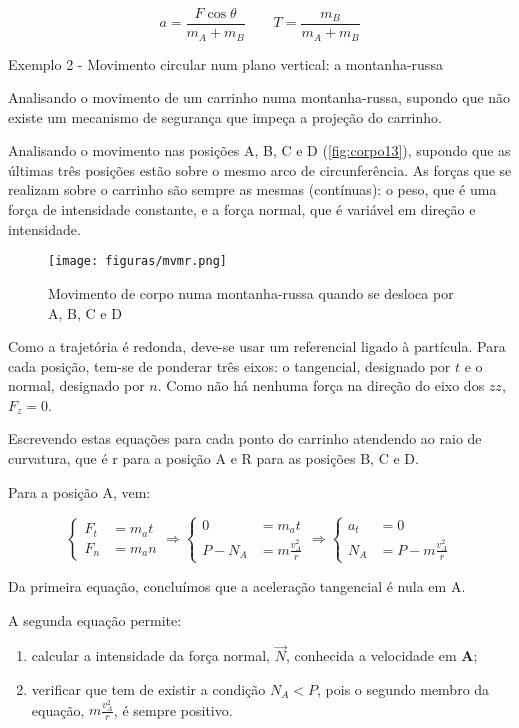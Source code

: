 \documentclass[a4paper,11pt,oneside]{report}
\begin{document}
\[
a = \frac{F\cos\theta}{m_A+m_B} \qquad T = \frac{m_B}{m_A+m_B}
\]

\begin{center}
    Exemplo 2 - Movimento circular num plano vertical: a montanha-russa
\end{center}

Analisando o movimento de um carrinho numa montanha-russa, supondo que não existe 
um mecanismo de segurança que impeça a projeção do carrinho.

Analisando o movimento nas posições A, B, C e D (\autoref{fig:corpo13}), supondo que as últimas 
três posições estão sobre o mesmo arco de circunferência. As forças que se realizam 
sobre o carrinho são sempre as mesmas (contínuas): o peso, que é uma força de intensidade 
constante, e a força normal, que é variável em direção e intensidade.

\begin{figure}[H]
    \center
    \texttt{[image: figuras/mvmr.png]}
    \caption{Movimento de corpo numa montanha-russa quando se desloca por A, B, C e D}
    \label{fig:corpo13}
\end{figure}

Como a trajetória é redonda, deve-se usar um referencial ligado à partícula. Para cada 
posição, tem-se de ponderar três eixos: o tangencial, designado por $t$ e o normal, 
designado por $n$. Como não há nenhuma força na direção do eixo dos $zz$, $F_z=0$.

Escrevendo estas equações para cada ponto do carrinho atendendo ao raio de curvatura, 
que é r para a posição A e R para as posições B, C e D.

Para a posição A, vem: 

\[
\left\{
\begin{array}{cl}
F_t & = m_at \\
F_n & = m_an
\end{array}
\right.
\Rightarrow
\left\{
\begin{array}{cl}
0 & = m_at \\
P - N_A & = m\frac{v_{A}^{2}}{r}
\end{array}
\right.
\Rightarrow
\left\{
\begin{array}{cl}
a_t & = 0 \\
N_A & = P - m\frac{v_{A}^{2}}{r}
\end{array}
\right.
\]

Da primeira equação, concluímos que a aceleração tangencial é nula em A.

A segunda equação permite:
\begin{enumerate}
    \item calcular a intensidade da força normal, $\vec N$, conhecida a velocidade em \textbf{A};
    \item verificar que tem de existir a condição $N_A < P$, pois o segundo membro da equação, $m\frac{v_{A}^{2}}{r}$, é sempre positivo.
\end{enumerate}
\end{document}
